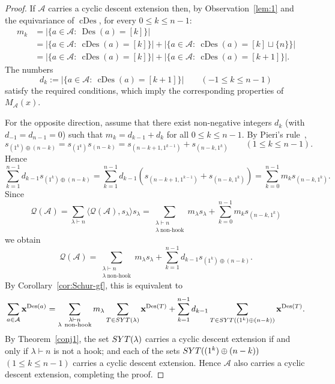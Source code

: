 \documentclass[ALCO,published]{cedram}
\newcommand{\Q}{\mathcal Q}
\newcommand{\A}{\mathcal A}
\DeclareMathOperator\Des{Des}
\DeclareMathOperator\cDes{cDes}
\def\SYT{{\rm SYT}}
\newcommand{\card}[1]{\ensuremath{\left|#1\right|}}
\begin{document}
\begin{proof}
    If $\A$ carries a cyclic descent extension then, by Observation~\ref{lem:1} and the equivariance of $\cDes$, for every $0 \le k \le n-1$:
    \begin{align*}
        m_k
        &= \card{\{a\in \A:\ \Des(a)=[k]\}} \\
        &= \card{\{a\in \A:\ \cDes(a)=[k]\}}+\card{\{a\in \A:\ \cDes(a)=[k]\sqcup\{n\}\}} \\
        &= \card{\{a\in \A:\ \cDes(a)=[k]\}}+\card{\{a\in \A:\ \cDes(a)=[k+1]\}}.
    \end{align*}
    The numbers
    \[
        d_k := \card{\{a\in \A:\ \cDes(a)=[k+1]\}}
        \qquad (-1 \le k \le n-1)
    \]
    satisfy the required conditions,
    which imply the corresponding properties of $M_\A(x)$.

    For the opposite direction, assume that
    there exist non-negative integers $d_k$ (with $d_{-1} = d_{n-1} = 0$)
    such that $m_k=d_{k-1}+d_k$ for all $0\le k\le n-1$. 
    By Pieri's rule~\cite[Theorem 7.15.7]{EC2}, 
    \[
        s_{(1^k) \oplus (n-k)}=s_{(1^k)} s_{(n-k)}=s_{(n-k+1,1^{k-1})}+s_{(n-k,1^k)}
        \qquad (1 \le k \le n-1).
    \]
    Hence
    \[
        \sum_{k=1}^{n-1} d_{k-1} s_{(1^k)\oplus (n-k)} 
        = \sum_{k=1}^{n-1} d_{k-1} (s_{(n-k+1,1^{k-1})}+s_{(n-k,1^k)})
        =\sum_{k=0}^{n-1} m_k s_{(n-k,1^k)}. 
    \]
    Since
    \[
        \Q(\A) 
        = \sum_{\lambda \vdash n} \langle \Q(\A), s_\lambda \rangle s_\lambda 
        = \sum_{\substack{\lambda\vdash n \\ \lambda \ \text{non-hook}}} m_\lambda s_\lambda +
        \sum_{k=0}^{n-1} m_k s_{(n-k,1^k)}
    \]
    we obtain
    \begin{equation}\label{eq:q}
        \Q(\A) 
        = \sum_{\substack{\lambda\vdash n \\ \lambda \ \text{non-hook}}} m_\lambda s_\lambda +
        \sum_{k=1}^{n-1} d_{k-1} s_{(1^k)\oplus (n-k)}.
    \end{equation}
    By Corollary~\ref{cor:Schur-gf}, this is equivalent to
    \[
        \sum_{a\in \A} {\bf x}^{\Des(a)} = \sum_{\substack{\lambda\vdash n \\ \lambda\ \text{non-hook}}} m_\lambda 
        \sum_{T\in \SYT(\lambda)} {\bf x}^{\Des(T)} + 	\sum_{k=1}^{n-1} d_{k-1}
        \sum_{T \in \SYT((1^k)\oplus (n-k))} {\bf x}^{\Des(T)}.
    \]
    By Theorem~\ref{conj1},  
    the set $\SYT(\lambda)$ carries a cyclic descent extension if and only if $\lambda \vdash n$ is not a hook; 
    and each of the sets $\SYT((1^k)\oplus (n-k))$ $(1 \le k \le n-1)$ carries a cyclic descent extension. 
    Hence $\A$ also carries a cyclic descent extension, completing the proof. 
\end{proof}
\end{document}
